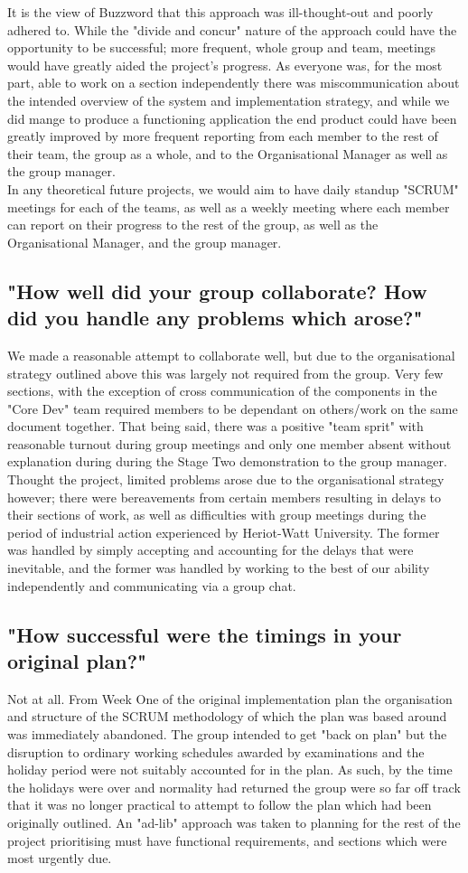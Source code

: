 \documentclass[11pt, oneside, a4paper]{report}   %
\begin{document}
It is the view of Buzzword that this approach was ill-thought-out and poorly adhered to. While the "divide and concur" nature of the approach could have the 
opportunity to be successful; more frequent, whole group and team, meetings would have greatly aided the project's progress. 
As everyone was, for the most part, able to work on a section independently there was miscommunication about the intended overview of the system and 
implementation strategy, and while we did mange to produce a functioning application the end product could have been greatly improved by more 
frequent reporting from each member to the rest of their team, the group as a whole, and to the Organisational Manager as well as the group manager.\\ 
In any theoretical future projects, we would aim to have daily standup "SCRUM" meetings for each of the teams, as well as a weekly meeting where each member
can report on their progress to the rest of the group, as well as the Organisational Manager, and the group manager.  
\subsection{"How well did your group collaborate? How did you handle any problems which arose?"} \label{sec:Organisation - 2}
We made a reasonable attempt to collaborate well, but due to the organisational strategy outlined above this was largely not required from the group. Very few sections, 
with the exception of cross communication of the components in the "Core Dev" team required members to be dependant on others/work on the same document 
together. That being said, there was a positive "team sprit" with reasonable turnout during group meetings and only one member absent without explanation during during
the Stage Two demonstration to the group manager. Thought the project, limited problems arose due to the organisational strategy however;  there were bereavements from 
certain members resulting in delays to their sections of work, as well as difficulties with group meetings during the period of industrial action experienced by Heriot-Watt University.
The former was handled by simply accepting and accounting for the delays that were inevitable, and the former was handled by working to the best of our ability independently and 
communicating via a group chat.
\subsection{"How successful were the timings in your original plan?"} \label{sec:Organisation - 3}
Not at all. From Week One of the original implementation plan the organisation and structure of the SCRUM methodology of which the plan was based around was immediately 
abandoned. The group intended to get "back on plan" but the disruption to ordinary working schedules awarded by examinations and the holiday period were not suitably accounted 
for in the plan. As such, by the time the holidays were over and normality had returned the group were so far off track that it was no longer practical to attempt to follow the plan 
which had been originally outlined. An "ad-lib" approach was taken to planning for the rest of the project prioritising must have functional requirements, and sections which were most
urgently due. 
\pagebreak
\end{document}
